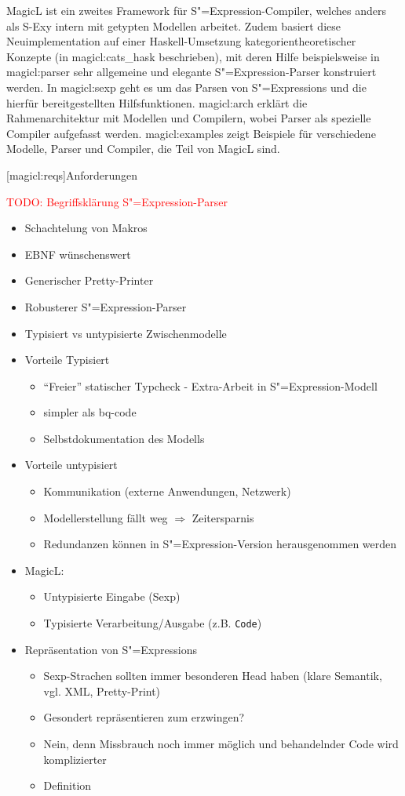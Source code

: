 \documentclass[a4paper, bibgerm]{book}
\newcommand\icode[1]{\lstinline?#1?}
\newcommand{\todo}[1]{
  \textcolor{red}{TODO: #1}
}
\newcommand\lsection{}
\newcommand\sref{}
\newcommand{\sexy}{S-Exy}
\newcommand{\sexp}{S"=Expression}
\newcommand{\sexps}{S"=Expressions}
\begin{document}
MagicL ist ein zweites Framework für \sexp-Compiler, welches anders
als \sexy{} intern mit getypten Modellen arbeitet. Zudem basiert diese
Neuimplementation auf einer Haskell-Umsetzung kategorientheoretischer
Konzepte (in \sref{magicl:cats_hask} beschrieben), mit deren Hilfe
beispielsweise in \sref{magicl:parser} sehr allgemeine und elegante
\sexp{}-Parser konstruiert werden. In \sref{magicl:sexp} geht es um
das Parsen von \sexps{} und die hierfür bereitgestellten
Hilfsfunktionen. \sref{magicl:arch} erklärt die Rahmenarchitektur mit
Modellen und Compilern, wobei Parser als spezielle Compiler aufgefasst
werden. \sref{magicl:examples} zeigt Beispiele für verschiedene
Modelle, Parser und Compiler, die Teil von MagicL sind.

\lsection[magicl:reqs]{Anforderungen}

\todo{Begriffsklärung \sexp{}-Parser}

\begin{itemize}
\item Schachtelung von Makros
\item EBNF wünschenswert
\item Generischer Pretty-Printer
\item Robusterer \sexp-{Parser}
\item Typisiert vs untypisierte Zwischenmodelle
\item Vorteile Typisiert
  \begin{itemize}
  \item "`Freier"' statischer Typcheck - Extra-Arbeit in \sexp{}-Modell
  \item simpler als bq-code
  \item Selbstdokumentation des Modells
  \end{itemize}
\item Vorteile untypisiert
  \begin{itemize}
  \item Kommunikation (externe Anwendungen, Netzwerk)
  \item Modellerstellung fällt weg $\Rightarrow$ Zeitersparnis
  \item Redundanzen können in \sexp{}-Version herausgenommen werden
  \end{itemize}
\item MagicL:
  \begin{itemize}
  \item Untypisierte Eingabe (Sexp)
  \item Typisierte Verarbeitung/Ausgabe (z.B. \icode{Code})
  \end{itemize}
\item Repräsentation von \sexps{}
  \begin{itemize}
  \item Sexp-Strachen sollten immer besonderen Head haben (klare
    Semantik, vgl. XML, Pretty-Print)
  \item Gesondert repräsentieren zum erzwingen?
  \item Nein, denn Missbrauch noch immer möglich und behandelnder Code
    wird komplizierter
  \item Definition
  \end{itemize}
\end{itemize}
\end{document}
